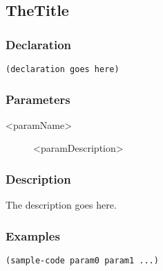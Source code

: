\subsection{TheTitle}
\label{<key>}

\subsubsection*{Declaration}
\begin{lstlisting}
(declaration goes here)
\end{lstlisting}

\subsubsection*{Parameters}
\begin{description}
	\item[<paramName>] <paramDescription>
\end{description}

\subsubsection*{Description}
The description goes here.

\subsubsection*{Examples}
\begin{lstlisting}
(sample-code param0 param1 ...)
\end{lstlisting}

